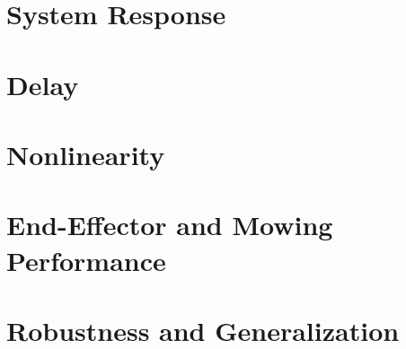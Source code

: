 \section{System Response}
\label{sec:eval:system-response}

\section{Delay}
\label{sec:eval:delay}

\section{Nonlinearity}
\label{sec:eval:nonlinearity}

\section{End-Effector and Mowing Performance}
\label{sec:eval:tracking}

\section{Robustness and Generalization}
\label{sec:eval:robustness}

